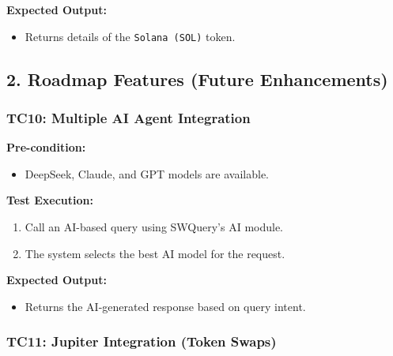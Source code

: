 \documentclass[
]{article}
\providecommand{\tightlist}{%
  \setlength{\itemsep}{0pt}\setlength{\parskip}{0pt}}
\begin{document}
\textbf{Expected Output:}

\begin{itemize}
\tightlist
\item
  Returns details of the \texttt{Solana\ (SOL)} token.
\end{itemize}

\hypertarget{roadmap-features-future-enhancements-1}{%
\subsection{\texorpdfstring{\textbf{2. Roadmap Features (Future
Enhancements)}}{2. Roadmap Features (Future Enhancements)}}\label{roadmap-features-future-enhancements-1}}

\hypertarget{tc10-multiple-ai-agent-integration}{%
\subsubsection{\texorpdfstring{\textbf{TC10: Multiple AI Agent
Integration}}{TC10: Multiple AI Agent Integration}}\label{tc10-multiple-ai-agent-integration}}

\textbf{Pre-condition:}

\begin{itemize}
\tightlist
\item
  DeepSeek, Claude, and GPT models are available.
\end{itemize}

\textbf{Test Execution:}

\begin{enumerate}
\def\labelenumi{\arabic{enumi}.}
\tightlist
\item
  Call an AI-based query using SWQuery's AI module.
\item
  The system selects the best AI model for the request.
\end{enumerate}

\textbf{Expected Output:}

\begin{itemize}
\tightlist
\item
  Returns the AI-generated response based on query intent.
\end{itemize}

\hypertarget{tc11-jupiter-integration-token-swaps}{%
\subsubsection{\texorpdfstring{\textbf{TC11: Jupiter Integration (Token
Swaps)}}{TC11: Jupiter Integration (Token Swaps)}}\label{tc11-jupiter-integration-token-swaps}}
\end{document}
